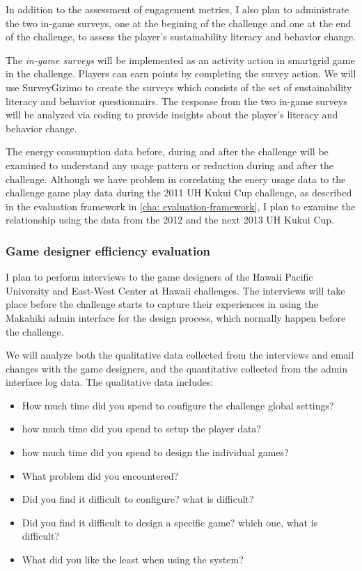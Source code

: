 In addition to the assessment of engagement metrics, I also plan to administrate the two in-game surveys, one at the begining of the challenge and one at the end of the challenge, to assess the player's sustainability literacy and behavior change.

The \emph{in-game surveys} will be implemented as an activity action in smartgrid game in the challenge. Players can earn points by completing the survey action. We will use SurveyGizimo to create the surveys which consists of the set of sustainability literacy and behavior questionnairs. The response from the two in-game surveys will be analyzed via coding to provide insights about the player's literacy and behavior change.

The energy consumption data before, during and after the challenge will be examined to understand any usage pattern or reduction during and after the challenge. Although we have problem in correlating the enery usage data to the challenge game play data during the 2011 UH Kukui Cup challenge, as described in the evaluation framework in \autoref{cha: evaluation-framework}, I plan to examine the relationship using the data from the 2012 and the next 2013 UH Kukui Cup.

\subsubsection{Game designer efficiency evaluation}
I plan to perform interviews to the game designers of the Hawaii Pacific University and East-West Center at Hawaii challenges. The interviews will take place before the challenge starts to capture their experiences in using the Makahiki admin interface for the design process, which normally happen before the challenge.

We will analyze both the qualitative data collected from the interviews and email changes with the game designers, and the quantitative collected from the admin interface log data. The qualitative data includes:
\begin{itemize}
    \item How much time did you spend to configure the challenge global settings?
    \item how much time did you spend to setup the player data?
    \item how much time did you spend to design the individual games?
    \item What problem did you encountered?
    \item Did you find it difficult to configure? what is difficult?
    \item Did you find it difficult to design a specific game? which one, what is difficult?
    \item What did you like the least when using the system?
\end{itemize}

